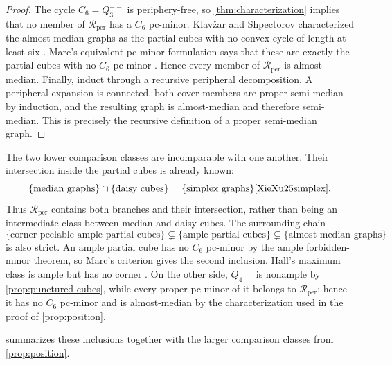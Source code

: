 \documentclass[11pt]{article}
\theoremstyle{definition}
\theoremstyle{remark}
\newcommand{\Rper}{\mathcal R_{\mathrm{per}}}
\begin{document}
\begin{proof}
The cycle \(C_6=Q_3^{--}\) is periphery-free, so
\cref{thm:characterization} implies that no member of \(\Rper\) has a
\(C_6\) pc-minor.  Klav\v{z}ar and Shpectorov characterized the
almost-median graphs as the partial cubes with no convex cycle of length at
least six \cite[Theorem~4.1]{klavvzar2012characterizing}.  Marc's equivalent
pc-minor formulation says that these are exactly the partial cubes with no
\(C_6\) pc-minor \cite[Theorem~4.4.4]{marc2018cycling}.  Hence every member of
\(\Rper\) is almost-median.  Finally, induct through a recursive peripheral
decomposition.  A peripheral expansion is connected, both cover members are
proper semi-median by induction, and the resulting graph is almost-median
and therefore semi-median.  This is precisely the recursive definition of a
proper semi-median graph.
\end{proof}

The two lower comparison classes are incomparable with one another.  Their
intersection inside the partial cubes is already known:
\[
 \{\text{median graphs}\}\cap\{\text{daisy cubes}\}
 =\{\text{simplex graphs}\}
 \cite[Theorem~1.2]{XieXu25simplex}.
\]
Thus \(\Rper\) contains both branches and their intersection, rather than
being an intermediate class between median and daisy cubes.
The surrounding chain
\[
 \{\text{corner-peelable ample partial cubes}\}
 \subsetneq\{\text{ample partial cubes}\}
 \subsetneq\{\text{almost-median graphs}\}
\]
is also strict. An ample partial cube has no \(C_6\) pc-minor by the
ample forbidden-minor theorem, so Marc's criterion gives the second
inclusion. Hall's maximum class is ample but has no corner
\cite[Theorem~4.5]{ChalopiChepoiMoran22}.  On the other side,
\(Q_4^{--}\) is nonample by \cref{prop:punctured-cubes}, while every proper
pc-minor of it belongs to \(\Rper\); hence it has no \(C_6\) pc-minor and is
almost-median by the characterization used in the proof of
\cref{prop:position}.

 summarizes these inclusions together with the
larger comparison classes from \cref{prop:position}.
\end{document}

